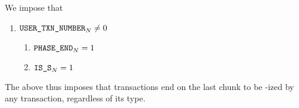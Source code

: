 We impose that
\begin{enumerate}[resume]
    \item \If $\texttt{USER}\texttt{\_}\texttt{TXN\_NUMBER}_{N} \neq 0$ \Then
        \begin{enumerate}
            \item $\texttt{PHASE\_END} _{N} = 1$
            \item $\texttt{IS\_S}   _{N} = 1$
        \end{enumerate}
\end{enumerate}
The above thus imposes that transactions end on the last chunk to be \rlp{}-ized by any transaction, regardless of its type.
